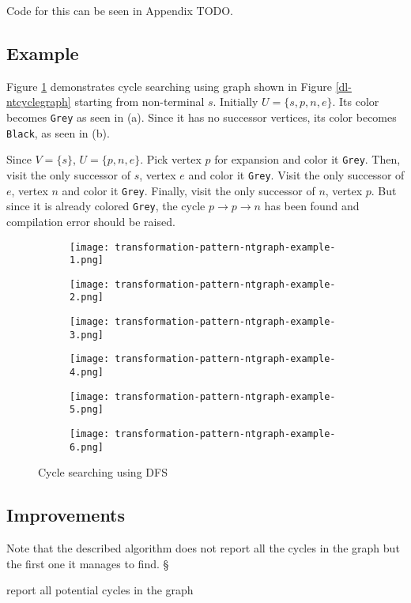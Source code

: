 Code for this can be seen in Appendix TODO.


\subsection{Example}

Figure \ref{ntcycle-dfs-example} demonstrates cycle searching using graph shown in Figure \ref{dl-ntcyclegraph} starting from non-terminal $s$. Initially $U=\{s,p,n,e\}$. Its color becomes \texttt{Grey} as seen in (a). Since it has no successor vertices, its color becomes \texttt{Black}, as seen in (b). 

Since $V = \{ s \}$, $U=\{p,n,e\}$. Pick vertex $p$ for expansion and color it \texttt{Grey}. Then, visit the only successor of $s$, vertex $e$ and color it \texttt{Grey}. Visit the only successor of $e$, vertex $n$ and color it \texttt{Grey}. Finally, visit the only successor of $n$, vertex $p$. But since it is already colored \texttt{Grey}, the cycle  $p \rightarrow p \rightarrow n$ has been found and compilation error should be raised.

\begin{figure}[H]
\begin{subfigure}{0.32\linewidth}
	\centering
	\texttt{[image: transformation-pattern-ntgraph-example-1.png]}
	\caption{}
\end{subfigure}
\begin{subfigure}{0.32\linewidth}
	\centering
	\texttt{[image: transformation-pattern-ntgraph-example-2.png]}
	\caption{}
\end{subfigure}
\begin{subfigure}{0.32\linewidth}
	\centering
	\texttt{[image: transformation-pattern-ntgraph-example-3.png]}
	\caption{}
\end{subfigure}

\begin{subfigure}{0.32\linewidth}
	\centering
	\texttt{[image: transformation-pattern-ntgraph-example-4.png]}
	\caption{}
\end{subfigure}
\begin{subfigure}{0.32\linewidth}
	\centering
	\texttt{[image: transformation-pattern-ntgraph-example-5.png]}
	\caption{}
\end{subfigure}
\begin{subfigure}{0.32\linewidth}
	\centering
	\texttt{[image: transformation-pattern-ntgraph-example-6.png]}
	\caption{}
\end{subfigure}
\label{ntcycle-dfs-example}
\caption{Cycle searching using DFS}
\end{figure}
\subsection{Improvements}
Note that the described algorithm does not report all the cycles in the graph but the first one it manages to find. §

report all potential cycles in the graph

